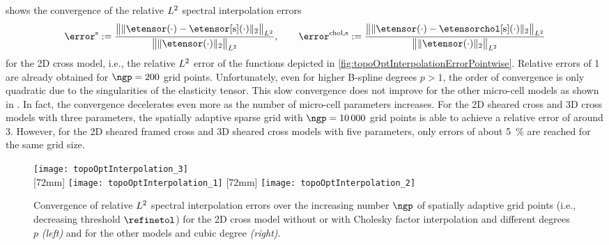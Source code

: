  shows
the convergence of the relative $L^2$ spectral interpolation errors
\begin{equation}
  \error^{\sparse} :=
  \frac{
    \normLtwoscaled{
      \vphantom{\big(}
      \norm[2]{\etensor({\cdot}) - \etensorintp({\cdot})}
    }
  }{
    \normLtwoscaled{
      \vphantom{\big(}
      \norm[2]{\etensor({\cdot})}
    }
  }, \qquad
  \error^{\chol,\sparse} :=
  \frac{
    \normLtwoscaled{
      \vphantom{\big(}
      \norm[2]{\etensor({\cdot}) - \etensorcholintp({\cdot})}
    }
  }{
    \normLtwoscaled{
      \vphantom{\big(}
      \norm[2]{\etensor({\cdot})}
    }
  }
\end{equation}
for the 2D cross model, i.e.,
the relative $L^2$ error of the functions depicted in
\cref{fig:topoOptInterpolationErrorPointwise}.
Relative errors of \SI{1}{\permille} are already obtained
for $\ngp = 200$ grid points.
Unfortunately, even for higher B-spline degrees $p > 1$,
the order of convergence is only quadratic
due to the singularities of the elasticity tensor.
This slow convergence does not improve for the other
micro-cell models as shown in
.
In fact, the convergence decelerates even more
as the number of micro-cell parameters increases.
For the 2D sheared cross and 3D cross models with three parameters,
the spatially adaptive sparse grid with $\ngp = \num{10000}$ grid points
is able to achieve a relative error of around \SI{3}{\permille}.
However, for the 2D sheared framed cross and 3D sheared cross models
with five parameters, only errors of about \SI{5}{\percent} are reached
for the same grid size.

\begin{figure}
  \hspace*{5mm}%
  \texttt{[image: topoOptInterpolation\_3]}%
  \hfill%
  \\[2mm]%
  [72mm]{%
    \texttt{[image: topoOptInterpolation\_1]}%
  }%
  \hfill%
  [72mm]{%
    \texttt{[image: topoOptInterpolation\_2]}%
  }%
  \caption[Convergence of relative $L^2$ spectral interpolation errors]{%
    Convergence of relative $L^2$ spectral interpolation errors
    over the increasing number $\ngp$ of spatially adaptive grid points
    (i.e., decreasing threshold $\refinetol$)
    for the 2D cross model without or with Cholesky factor interpolation
    and different degrees $p$ \emph{(left)} and
    for the other models and cubic degree \emph{(right)}.%
  }%
  \label{fig:topoOptInterpolationErrorBasisFunctions}%
\end{figure}



